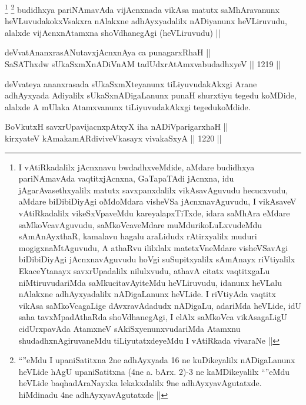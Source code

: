\begin{artha}
\footnote{I vAtiRkadalilx jAcnxnavu bwdadhxveMdide, aMdare budidhxya pariNAmavAda vaqtitxjAcnxna, GaTapaTAdi jAcnxna, idu jAgarAvasethxyalilx matutx savxpanxdalilx vikAsavAguvudu hecucxvudu, aMdare biDibiDiyAgi oMdoMdara visheVSa jAcnxnavAguvudu, I vikAsaveV vAtiRkadalilx vikeSxVpaveMdu kareyalapxTiTxde, idara saMhAra eMdare saMkoVcavAguvudu, saMkoVcaveMdare muMdurikoLuLxvudeMdu sAmAnAyxthaR, kamalavu hagalu araLidudx rAtirxyalilx muduri mogigxnaMtAguvudu, A athaRvu ililxlalx matetxVneMdare visheVSavAgi biDibiDiyAgi jAcnxnavAguvudu hoVgi suSupitxyalilx sAmAnayx riVtiyalilx EkaceYtanayx savxrUpadalilx nilulxvudu, athavA citatx vaqtitxgaLu niMtiruvudariMda saMkucitavAyiteMdu heVLiruvudu, idanunx heVLalu nAlakxne adhAyxyadalilx nADigaLanunx heVLide. I riVtiyAda vaqtitx vikAsa saMkoVcagaLige dAvxravAdadudx nADigaLu, adariMda heVLide, idU saha tavxMpadAthaRda shoVdhanegAgi, I elAlx saMkoVca vikAsagaLigU cidUrxpavAda AtamxneV sAkiSxyenunxvudariMda Atamxnu shudadhxnAgiruvaneMdu tiLiyutatxdeyeMdu I vAtiRkada vivaraNe ||}
\footnote{``\stext''eMdu I upaniSatitxna 2ne adhAyxyada 16 ne kuDikeyalilx nADigaLanunx heVLide hAgU upaniSatitxna (4ne a. bArx. 2)-3 ne kaMDikeyalilx ``\stext''eMdu heVLide baqhadAraNayxka lekakxdalilx 9ne adhAyxyavAgutatxde. hiMdinadu 4ne adhAyxyavAgutatxde ||}
budidhxya pariNAmavAda vijAcnxnada vikAsa matutx saMhAravanunx heVLuvudakokxVsakxra nAlakxne adhAyxyadalilx nADiyanunx heVLiruvudu, alalxde vijAcnxnAtamxna shoVdhanegAgi (heVLiruvudu) ||
\end{artha}

\begin{shl}
deVvatAnanxrasANutavxjAcnxnAya ca punagarxRhaH || \\
SaSAThxdw sUkaSxmXnADiVnAM tadUdxrA\s \s tAmxvabudadhxyeV ||  1219 || 
\end{shl}	

\begin{artha}
deVvateya ananxrasada sUkaSxmXteyanunx tiLiyuvudakAkxgi Arane adhAyxyada Adiyalilx sUkaSxnADigaLanunx punaH shurxtiyu tegedu koMDide, alalxde A mUlaka Atamxvanunx tiLiyuvudakAkxgi tegedukoMdide.
\end{artha}


\begin{shl}
BoVkutxH savxrUpavijacnxpAtxyX iha nADiVparigarxhaH || \\
kirxyateV kAmakamARdiviveVkasayx vivakaSxyA ||  1220 ||  
\end{shl}

